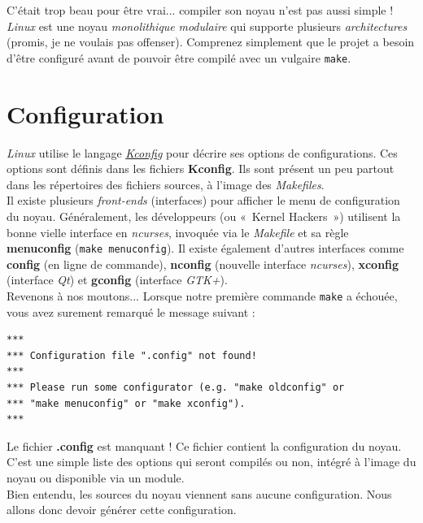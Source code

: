\documentclass[a4paper]{article}
\begin{document}
C'était trop beau pour être vrai... compiler son noyau n'est pas aussi simple ! \textit{Linux} est une noyau \textit{monolithique} \textit{modulaire} qui supporte plusieurs \textit{architectures} (promis, je ne voulais pas offenser). Comprenez simplement que le projet a besoin d'être configuré avant de pouvoir être compilé avec un vulgaire \lstset{language=sh}\lstinline{make}.\\

\clearpage
\section{Configuration}

\textit{Linux} utilise le langage \textit{\href{https://www.kernel.org/doc/Documentation/kbuild/kconfig-language.txt}{Kconfig}} pour décrire ses options de configurations. Ces options sont définis dans les fichiers \textbf{Kconfig}. Ils sont présent un peu partout dans les répertoires des fichiers sources, à l'image des \textit{Makefiles}.\\

Il existe plusieurs \textit{front-ends} (interfaces) pour afficher le menu de configuration du noyau. Généralement, les développeurs (ou «~Kernel Hackers~») utilisent la bonne vielle interface en \textit{ncurses}, invoquée via le \textit{Makefile} et sa règle \textbf{menuconfig} (\lstset{language=sh}\lstinline{make menuconfig}). Il existe également d'autres interfaces comme \textbf{config} (en ligne de commande), \textbf{nconfig} (nouvelle interface \textit{ncurses}), \textbf{xconfig} (interface \textit{Qt}) et \textbf{gconfig} (interface \textit{GTK+}).\\

Revenons à nos moutons... Lorsque notre première commande \lstset{language=sh}\lstinline{make} a échouée, vous avez surement remarqué le message suivant :
\begin{verbatim}
***
*** Configuration file ".config" not found!
***
*** Please run some configurator (e.g. "make oldconfig" or
*** "make menuconfig" or "make xconfig").
***
\end{verbatim}

Le fichier \textbf{.config} est manquant ! Ce fichier contient la configuration du noyau. C'est une simple liste des options qui seront compilés ou non, intégré à l'image du noyau ou disponible via un module.\\

Bien entendu, les sources du noyau viennent sans aucune configuration. Nous allons donc devoir générer cette configuration.\\
\end{document}
